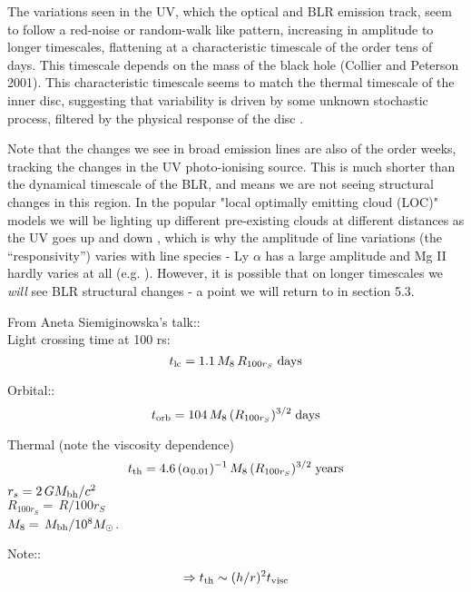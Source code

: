 \documentclass[11pt]{article}
\begin{document}
The variations seen in the UV, which the optical and BLR emission track, seem to follow a red-noise or random-walk like pattern, increasing in amplitude to longer timescales, flattening at a characteristic timescale of the order tens of days. This timescale depends on the mass of the black hole (Collier and Peterson 2001). This characteristic timescale seems to match the thermal timescale of the inner disc, suggesting that variability is driven by some unknown stochastic process, filtered by the physical response of the disc \citep{Kelly2009, Kelly2011}.

Note that the changes we see in broad emission lines are also of the order weeks, tracking the changes in the UV photo-ionising source. This is much shorter than the dynamical timescale of the BLR, and means we are not seeing structural changes in this region. In the popular "local optimally emitting cloud (LOC)" models we will be lighting up different pre-existing clouds at different distances as the UV goes up and down \citep{Peterson2006,Goad2014}, which is why the amplitude of line variations (the ``responsivity'') varies with line species - Ly $\alpha$ has a large amplitude and Mg II hardly varies at all (e.g. \citet{Cackett2015}). However, it is possible that on longer timescales we {\em will} see BLR structural changes - a point we will return to in section 5.3.


\medskip \medskip
\noindent
From Aneta Siemiginowska's talk::\\
Light crossing time at 100 rs:
\begin{equation}
    t_{\rm lc} = 1.1 \,  M_{8} \, R_{100 r_{S}}  \; {\rm days}
\end{equation}

\noindent
Orbital::
\begin{equation}
  t_{\rm orb} = 104 \, M_{8} \,  (R_{100r_{S}})^{3/2} \;  {\rm days}
\end{equation}

\noindent
Thermal (note the viscosity dependence)
\begin{equation}
  t_{\rm th} = 4.6 \, (\alpha_{0.01})^{-1} \, M_{8}\, (R_{100r_{S}} )^{3/2}  \; {\rm years}
\end{equation}
$r_{s} = 2 \,  GM_{\rm bh}/c^{2}$ \\ 
$R_{100r_{S}} = \, R / 100 r_{S}$  \\
$M_{8} = \,  M_{\rm bh} /10^{8} M_{\odot}$.

\medskip
\noindent
Note:: 
\begin{equation}
  \Rightarrow t_{\rm th} \sim (h/r)^{2} t_{\rm visc}
\end{equation}
\end{document}
